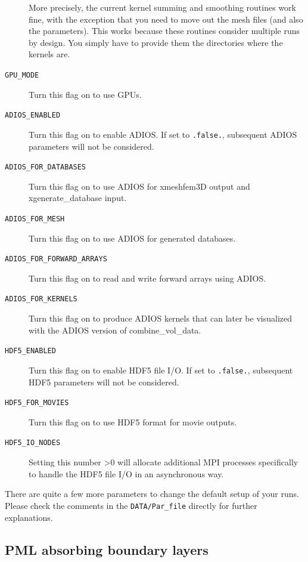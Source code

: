 \begin{description}
More precisely, the current kernel summing and smoothing routines work fine, with the exception that you need to move out the mesh files (and also the parameters). This works because these routines consider multiple runs by design. You simply have to provide them the directories where the kernels are.\newline

\item [{\texttt{GPU\_MODE}}] Turn this flag on to use GPUs.

\item [\texttt{ADIOS\_ENABLED}] Turn this flag on to enable ADIOS. If set to \texttt{.false.}, subsequent ADIOS
parameters will not be considered.
%
\item [\texttt{ADIOS\_FOR\_DATABASES}] Turn this flag on to use ADIOS for xmeshfem3D output and
xgenerate\_database input.
%
\item [\texttt{ADIOS\_FOR\_MESH}]  Turn this flag on to use ADIOS for generated databases.
%
\item [\texttt{ADIOS\_FOR\_FORWARD\_ARRAYS}] Turn this flag on to read and write forward arrays using ADIOS.
%
\item [\texttt{ADIOS\_FOR\_KERNELS}] Turn this flag on to produce ADIOS kernels that can later be visualized with the ADIOS version of combine\_vol\_data.

\item [\texttt{HDF5\_ENABLED}] Turn this flag on to enable HDF5 file I/O. If set to \texttt{.false.}, subsequent HDF5
parameters will not be considered.
%
\item [\texttt{HDF5\_FOR\_MOVIES}] Turn this flag on to use HDF5 format for movie outputs.
%
\item [\texttt{HDF5\_IO\_NODES}] Setting this number >0 will allocate additional MPI processes specifically to handle
the HDF5 file I/O in an asynchronous way.

\end{description}
There are quite a few more parameters to change the default setup of your runs. Please check the comments in the \texttt{DATA/Par\_file} directly for further explanations.\newline



\subsection{PML absorbing boundary layers}


